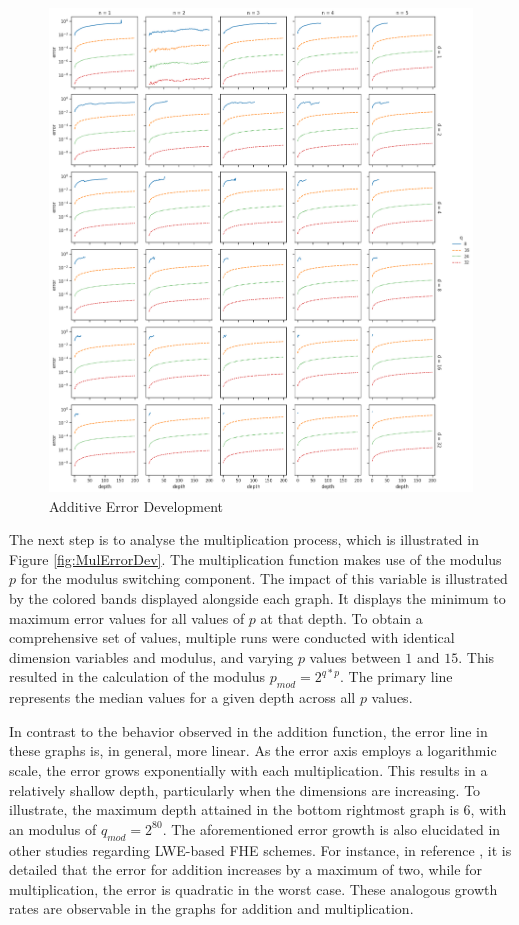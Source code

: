 \begin{figure}[ht!]
  \centering
  \includegraphics[scale=0.38]{images/AddErrorDevelopment.png}
  \caption[Additive Error Development]{Additive Error Development}
  \label{fig:AddErrorDev}
\end{figure}

The next step is to analyse the multiplication process, which is illustrated in Figure \ref{fig:MulErrorDev}. The multiplication function makes use of the modulus $p$ for the modulus switching component. The impact of this variable is illustrated by the colored bands displayed alongside each graph. It displays the minimum to maximum error values for all values of $p$ at that depth. To obtain a comprehensive set of values, multiple runs were conducted with identical dimension variables and modulus, and varying $p$ values between $1$ and $15$. This resulted in the calculation of the modulus $p_{mod}=2^{q*p}$. The primary line represents the median values for a given depth across all $p$ values.

In contrast to the behavior observed in the addition function, the error line in these graphs is, in general, more linear. As the error axis employs a logarithmic scale, the error grows exponentially with each multiplication. This results in a relatively shallow depth, particularly when the dimensions are increasing. To illustrate, the maximum depth attained in the bottom rightmost graph is $6$, with an modulus of $q_{mod} = 2^{80}$. The aforementioned error growth is also elucidated in other studies regarding LWE-based FHE schemes. For instance, in reference \cite{FHEwoBottstrapping}, it is detailed that the error for addition increases by a maximum of two, while for multiplication, the error is quadratic in the worst case. These analogous growth rates are observable in the graphs for addition and multiplication.


